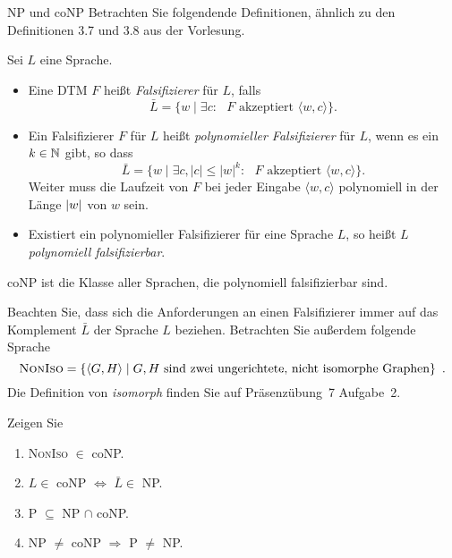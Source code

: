 \documentclass[answers]{submit}
\begin{document}
\clearpage

\begin{exercise}[12]{NP und coNP}
  Betrachten Sie folgendende Definitionen, ähnlich zu den Definitionen 3.7 und 3.8 aus der Vorlesung.
  \begin{definition}
    Sei $L$ eine Sprache.
    \begin{itemize}
      \item Eine DTM $F$ heißt \emph{Falsifizierer} für $L$, falls
            \[
              \bar L = \{w\mid \text{$\exists c:$ $F$ akzeptiert $\langle w,c\rangle$}\}.
            \]
      \item Ein Falsifizierer $F$ für $L$  heißt \emph{polynomieller Falsifizierer} für $L$, wenn
            es ein $k\in \mathbb{N}$ gibt, so dass
            \[
              \bar L = \{w\mid \text{$\exists c, |c|\le |w|^k:$ $F$ akzeptiert $\langle w,c\rangle$}\}.
            \]
            Weiter muss die Laufzeit von $F$ bei jeder Eingabe $\langle w,c\rangle$ polynomiell in der Länge $\left\vert w \right\vert$ von $w$ sein.
      \item Existiert ein polynomieller Falsifizierer für eine Sprache $L$, so heißt $L$ \emph{polynomiell falsifizierbar}.
    \end{itemize}
  \end{definition}
  \begin{definition}
    {\normalfont coNP} ist die Klasse aller Sprachen, die polynomiell falsifizierbar sind.
  \end{definition}
  Beachten Sie, dass sich die Anforderungen an einen Falsifizierer immer auf das Komplement $\bar L$ der Sprache $L$ beziehen.
  Betrachten Sie außerdem folgende Sprache
  \[ \textsc{NonIso} = \left\{ \langle G,H\rangle \;\middle|\; \mbox{$G,H$ sind zwei ungerichtete, nicht isomorphe Graphen} \right\} \ . \]
  Die Definition von \emph{isomorph} finden Sie auf Präsenzübung~7 Aufgabe~2.

  Zeigen Sie
  \begin{enumerate}
    \item \textsc{NonIso} $\in$ coNP.
    \item $L\in$ coNP $\Leftrightarrow$ $\bar L\in$ NP.
    \item P $\subseteq$ NP $\cap$ coNP.
    \item NP $\neq$ coNP $\Rightarrow$ P $\neq$ NP.
  \end{enumerate}

\end{exercise}
\end{document}
